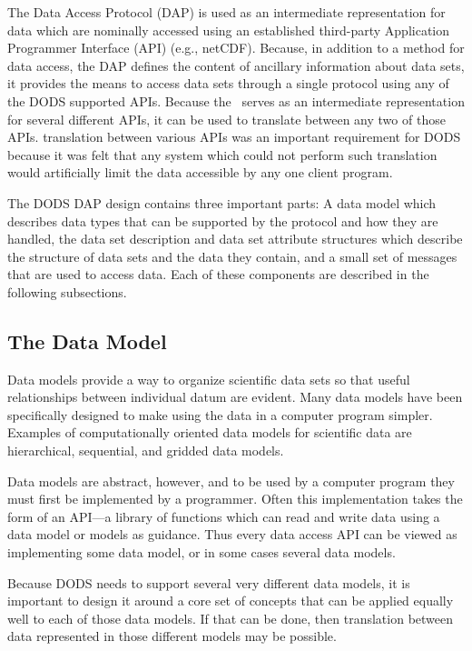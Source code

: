 The Data Access Protocol (DAP) is used as an intermediate representation for
data which are nominally accessed using an established third-party
Application Programmer Interface (API) (e.g., netCDF). Because, in addition
to a method for data access, the DAP defines the content of ancillary
information about data sets, it provides the means to access data sets
through a single protocol using any of the DODS supported APIs. Because the
\dap\ serves as an intermediate representation for several different APIs, it
can be used to translate between any two of those APIs\cite{treinish:models}.
translation between various APIs was an important requirement for DODS
because it was felt that any system which could not perform such translation
would artificially limit the data accessible by any one client
program\cite{DODS:workshop1}.

The DODS DAP design contains three important parts: A data model which
describes data types that can be supported by the protocol and how they are
handled, the data set description and data set attribute structures which
describe the structure of data sets and the data they contain, and a small
set of messages that are used to access data. Each of these components are
described in the following subsections.

\subsection{The Data Model}

Data models provide a way to organize scientific data sets so that useful
relationships between individual datum are evident. Many data models have
been specifically designed to make using the data in a computer program
simpler\cite{rew:netcdf}\cite{NCSA:HDF}. Examples of computationally oriented
data models for scientific data are hierarchical, sequential, and gridded
data models\cite{treinish:models}.

Data models are abstract, however, and to be used by a computer program they
must first be implemented by a programmer. Often this implementation takes
the form of an API---a library of functions which can read and write data
using a data model or models as
guidance\cite{rew:netcdf}\cite{NCSA:HDF}. Thus every data access API can be
viewed as implementing some data model, or in some cases several data models.

Because DODS needs to support several very different data models, it is
important to design it around a core set of concepts that can be applied
equally well to each of those data models. If that can be done, then
translation between data represented in those different models may be
possible\cite{treinish:models}.

